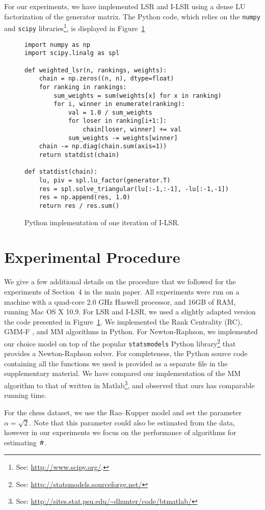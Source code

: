 For our experiments, we have implemented LSR and I-LSR using a dense LU factorization of the generator matrix.
The Python code, which relies on the \texttt{numpy} and \texttt{scipy} libraries\footnote{
See: \url{http://www.scipy.org/}.
}, is displayed in Figure~\ref{fix:lst:implementation}

\begin{figure}
\begin{lstlisting}
import numpy as np
import scipy.linalg as spl

def weighted_lsr(n, rankings, weights):
    chain = np.zeros((n, n), dtype=float)
    for ranking in rankings:
        sum_weights = sum(weights[x] for x in ranking)
        for i, winner in enumerate(ranking):
            val = 1.0 / sum_weights
            for loser in ranking[i+1:]:
                chain[loser, winner] += val
            sum_weights -= weights[winner]
    chain -= np.diag(chain.sum(axis=1))
    return statdist(chain)

def statdist(chain):
    lu, piv = spl.lu_factor(generator.T)
    res = spl.solve_triangular(lu[:-1,:-1], -lu[:-1,-1])
    res = np.append(res, 1.0)
    return res / res.sum()
\end{lstlisting}
\caption{
Python implementation of one iteration of I-LSR.
}
\label{fix:lst:implementation}
\end{figure}

\section{Experimental Procedure}

We give a few additional details on the procedure that we followed for the experiments of Section~4 in the main paper.
All experiments were run on a machine with a quad-core 2.0 GHz Haswell processor, and 16GB of RAM, running Mac OS X 10.9.
For LSR and I-LSR, we used a slightly adapted version the code presented in Figure~\ref{fix:lst:implementation}.
We implemented the Rank Centrality (RC), GMM-F \citep{azari2013generalized}, and MM \citep{hunter2004mm} algorithms in Python.
For Newton-Raphson, we implemented our choice model on top of the popular \texttt{statsmodels} Python library\footnote{
See: \url{http://statsmodels.sourceforge.net/}
} that provides a Newton-Raphson solver.
For completeness, the Python source code containing all the functions we used is provided as a separate file in the supplementary material.
We have compared our implementation of the MM algorithm to that of \citeauthor{hunter2004mm} written in Matlab\footnote{
See: \url{http://sites.stat.psu.edu/~dhunter/code/btmatlab/}
}, and observed that ours has comparable running time.

For the chess dataset, we use the Rao--Kupper model and set the parameter $\alpha = \sqrt{2}$.
Note that this parameter could also be estimated from the data, however in our experiments we focus on the performance of algorithms for estimating $\hat{\bm{\pi}}$.
